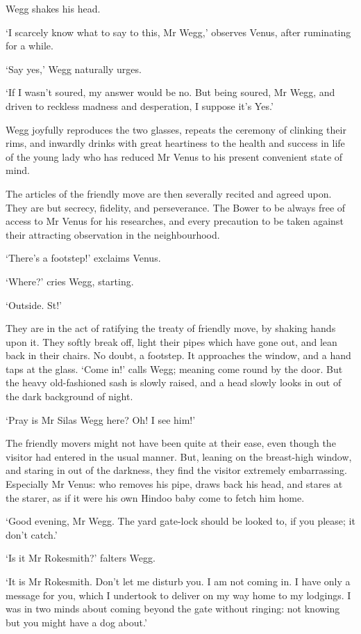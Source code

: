 Wegg shakes his head.

‘I scarcely know what to say to this, Mr Wegg,’ observes Venus, after
ruminating for a while.

‘Say yes,’ Wegg naturally urges.

‘If I wasn’t soured, my answer would be no. But being soured, Mr Wegg,
and driven to reckless madness and desperation, I suppose it’s Yes.’

Wegg joyfully reproduces the two glasses, repeats the ceremony of
clinking their rims, and inwardly drinks with great heartiness to the
health and success in life of the young lady who has reduced Mr Venus to
his present convenient state of mind.

The articles of the friendly move are then severally recited and agreed
upon. They are but secrecy, fidelity, and perseverance. The Bower to
be always free of access to Mr Venus for his researches, and every
precaution to be taken against their attracting observation in the
neighbourhood.

‘There’s a footstep!’ exclaims Venus.

‘Where?’ cries Wegg, starting.

‘Outside. St!’

They are in the act of ratifying the treaty of friendly move, by shaking
hands upon it. They softly break off, light their pipes which have gone
out, and lean back in their chairs. No doubt, a footstep. It approaches
the window, and a hand taps at the glass. ‘Come in!’ calls Wegg; meaning
come round by the door. But the heavy old-fashioned sash is slowly
raised, and a head slowly looks in out of the dark background of night.

‘Pray is Mr Silas Wegg here? Oh! I see him!’

The friendly movers might not have been quite at their ease, even
though the visitor had entered in the usual manner. But, leaning on the
breast-high window, and staring in out of the darkness, they find the
visitor extremely embarrassing. Especially Mr Venus: who removes his
pipe, draws back his head, and stares at the starer, as if it were his
own Hindoo baby come to fetch him home.

‘Good evening, Mr Wegg. The yard gate-lock should be looked to, if you
please; it don’t catch.’

‘Is it Mr Rokesmith?’ falters Wegg.

‘It is Mr Rokesmith. Don’t let me disturb you. I am not coming in. I
have only a message for you, which I undertook to deliver on my way home
to my lodgings. I was in two minds about coming beyond the gate without
ringing: not knowing but you might have a dog about.’

